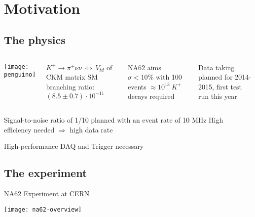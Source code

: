 \section{Motivation}
\subsection{The physics}
\begin{frame}{}{}
	\begin{columns}
	 		\begin{center} 
				\texttt{[image: penguino]}
			\end{center}
	    	\begin{block}{$K^+ \rightarrow \pi^+ \nu \bar{\nu} ~\Leftrightarrow ~
	    	V_{td}$ of CKM matrix} SM branching ratio: $(8.5\pm 0.7)\cdot 10^{-11}$
			\end{block}
			\begin{exampleblock}{NA62 aims $\sigma < 10\%$ with 100 events}
	    		$\approx 10^{13} ~ K^+$ decays required
			\end{exampleblock}
			Data taking planned for 2014-2015, first test run this year 
	\end{columns}
	\begin{block}{Signal-to-noise ratio of 1/10 planned with an event rate of 10
	MHz}
		High efficiency needed $\Rightarrow$ high data rate \\
		\begin{ergo}
			High-performance DAQ and Trigger necessary
		\end{ergo}
	\end{block}
\end{frame}

\subsection{The experiment}
\begin{frame}{NA62 Experiment at CERN}{}
	\begin{center} 
		\texttt{[image: na62-overview]}
	\end{center}
\end{frame}


